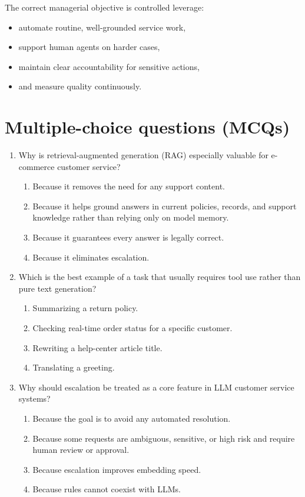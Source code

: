 The correct managerial objective is controlled leverage:
\begin{itemize}
  \item automate routine, well-grounded service work,
  \item support human agents on harder cases,
  \item maintain clear accountability for sensitive actions,
  \item and measure quality continuously.
\end{itemize}

\section{Multiple-choice questions (MCQs)}
\begin{enumerate}
  \item Why is retrieval-augmented generation (RAG) especially valuable for e-commerce customer service?
  \begin{enumerate}
    \item Because it removes the need for any support content.
    \item Because it helps ground answers in current policies, records, and support knowledge rather than relying only on model memory.
    \item Because it guarantees every answer is legally correct.
    \item Because it eliminates escalation.
  \end{enumerate}

  \item Which is the best example of a task that usually requires tool use rather than pure text generation?
  \begin{enumerate}
    \item Summarizing a return policy.
    \item Checking real-time order status for a specific customer.
    \item Rewriting a help-center article title.
    \item Translating a greeting.
  \end{enumerate}

  \item Why should escalation be treated as a core feature in LLM customer service systems?
  \begin{enumerate}
    \item Because the goal is to avoid any automated resolution.
    \item Because some requests are ambiguous, sensitive, or high risk and require human review or approval.
    \item Because escalation improves embedding speed.
    \item Because rules cannot coexist with LLMs.
  \end{enumerate}


\end{enumerate}
